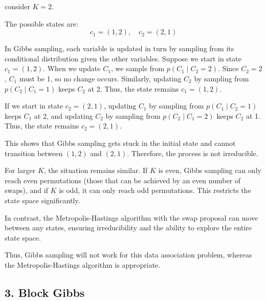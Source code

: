 \documentclass[a4 paper]{article}
\begin{document}
\begin{enumerate}
    consider \( K = 2 \).

    The possible states are:
    \[
    c_1 = (1, 2), \quad c_2 = (2, 1)
    \]
    
    In Gibbs sampling, each variable is updated in turn by sampling from its conditional distribution given the other variables. Suppose we start in state \( c_1 = (1, 2) \). When we update \( C_1 \), we sample from \( p(C_1 \mid C_2 = 2) \). Since \( C_2 = 2 \), \( C_1 \) must be 1, so no change occurs. Similarly, updating \( C_2 \) by sampling from \( p(C_2 \mid C_1 = 1) \) keeps \( C_2 \) at 2. Thus, the state remains \( c_1 = (1, 2) \).
    
    If we start in state \( c_2 = (2, 1) \), updating \( C_1 \) by sampling from \( p(C_1 \mid C_2 = 1) \) keeps \( C_1 \) at 2, and updating \( C_2 \) by sampling from \( p(C_2 \mid C_1 = 2) \) keeps \( C_2 \) at 1. Thus, the state remains \( c_2 = (2, 1) \).
    
    This shows that Gibbs sampling gets stuck in the initial state and cannot transition between \( (1, 2) \) and \( (2, 1) \). Therefore, the process is not irreducible.
    
    For larger \( K \), the situation remains similar. If \( K \) is even, Gibbs sampling can only reach even permutations (those that can be achieved by an even number of swaps), and if \( K \) is odd, it can only reach odd permutations. This restricts the state space significantly.
    
    In contrast, the Metropolis-Hastings algorithm with the swap proposal can move between any states, ensuring irreducibility and the ability to explore the entire state space.
    
    Thus, Gibbs sampling will not work for this data association problem, whereas the Metropolis-Hastings algorithm is appropriate.

\end{enumerate}






\newpage
\subsection*{3. Block Gibbs}
\end{document}
